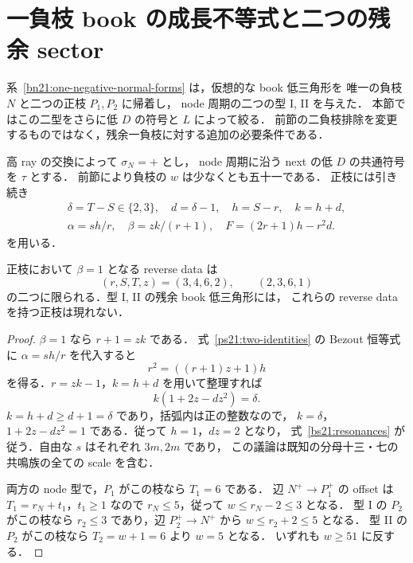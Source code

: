 \section{一負枝 book の成長不等式と二つの残余 sector}
\label{bs21:section}

系~\ref{bn21:one-negative-normal-forms} は，仮想的な book 低三角形を
唯一の負枝 $N$ と二つの正枝 $P_1,P_2$ に帰着し，
node 周期の二つの型 I, II を与えた．
本節ではこの二型をさらに低 $D$ の符号と $L$ によって絞る．
前節の二負枝排除を変更するものではなく，残余一負枝に対する追加の必要条件である．

高 ray の交換によって $\sigma_N=+$ とし，
node 周期に沿う next の低 $D$ の共通符号を $\tau$ とする．
前節により負枝の $w$ は少なくとも五十一である．
正枝には引き続き
\[
 \begin{gathered}
 \delta=T-S\in\{2,3\},\quad d=\delta-1,\quad h=S-r,\quad k=h+d,\\
 \alpha=sh/r,\quad\beta=zk/(r+1),\quad F=(2r+1)h-r^2d .
 \end{gathered}
\]
を用いる．

\begin{lemma}[共鳴尺度の分類と残余三角形での排除]
\label{bs21:beta}
正枝において $\beta=1$ となる reverse data は
\begin{equation}\label{bs21:resonances}
 (r,S,T,z)=(3,4,6,2),\qquad(2,3,6,1)
\end{equation}
の二つに限られる．型 I, II の残余 book 低三角形には，
これらの reverse data を持つ正枝は現れない．
\end{lemma}

\begin{proof}
$\beta=1$ なら $r+1=zk$ である．
式~\eqref{ps21:two-identities} の Bezout 恒等式に $\alpha=sh/r$ を代入すると
\[
 r^2=((r+1)z+1)h
\]
を得る．$r=zk-1$，$k=h+d$ を用いて整理すれば
\[
 k(1+2z-dz^2)=\delta.
\]
$k=h+d\ge d+1=\delta$ であり，括弧内は正の整数なので，
$k=\delta$，$1+2z-dz^2=1$ である．従って $h=1$，$dz=2$ となり，
式~\eqref{bs21:resonances} が従う．自由な $s$ はそれぞれ $3m,2m$ であり，
この議論は既知の分母十三・七の共鳴族の全ての scale を含む．

両方の node 型で，$P_1$ がこの枝なら $T_1=6$ である．
辺 $N^+\to P_1^+$ の offset は $T_1=r_N+t_1$，$t_1\ge1$ なので
$r_N\le5$，従って $w\le r_N-2\le3$ となる．
型 I の $P_2$ がこの枝なら $r_2\le3$ であり，辺 $P_2^+\to N^+$ から
$w\le r_2+2\le5$ となる．
型 II の $P_2$ がこの枝なら $T_2=w+1=6$ より $w=5$ となる．
いずれも $w\ge51$ に反する．
\end{proof}

